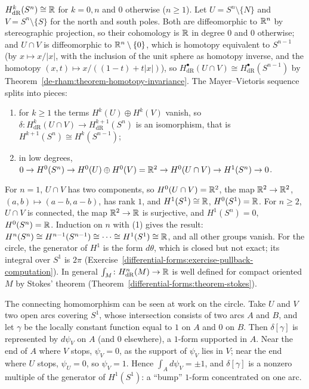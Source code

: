 \begin{example}\label{de-rham:example-spheres}
$H^k_{\mathrm{dR}}(S^n) \cong \mathbb{R}$ for $k = 0, n$ and $0$ otherwise ($n \geq 1$). Let $U = S^n \setminus \{N\}$ and $V = S^n \setminus \{S\}$ for the north and south poles. Both are
diffeomorphic to $\mathbb{R}^n$ by stereographic projection, so their cohomology is $\mathbb{R}$ in degree $0$ and $0$ otherwise; and $U \cap V$ is diffeomorphic to $\mathbb{R}^n \setminus \{0\}$, which is
homotopy equivalent to $S^{n-1}$ (by $x \mapsto x/|x|$, with the inclusion of the unit sphere as homotopy inverse, and the homotopy $(x, t) \mapsto x/((1 - t) + t|x|)$), so
$H^\bullet_{\mathrm{dR}}(U \cap V) \cong H^\bullet_{\mathrm{dR}}(S^{n-1})$ by Theorem~\ref{de-rham:theorem-homotopy-invariance}. The Mayer--Vietoris sequence splits into pieces:
\begin{enumerate}
\item for $k \geq 1$ the terms $H^k(U) \oplus H^k(V)$ vanish, so $\delta \colon H^k_{\mathrm{dR}}(U \cap V) \to H^{k+1}_{\mathrm{dR}}(S^n)$ is an isomorphism, that is
$H^{k+1}(S^n) \cong H^k(S^{n-1})$;
\item in low degrees, $0 \to H^0(S^n) \to H^0(U) \oplus H^0(V) = \mathbb{R}^2 \to H^0(U \cap V) \to H^1(S^n) \to 0$.
\end{enumerate}
For $n = 1$, $U \cap V$ has two components, so $H^0(U \cap V) = \mathbb{R}^2$, the map $\mathbb{R}^2 \to \mathbb{R}^2$, $(a, b) \mapsto (a - b, a - b)$, has rank $1$, and $H^1(S^1) \cong \mathbb{R}$, $H^0(S^1) = \mathbb{R}$. For
$n \geq 2$, $U \cap V$ is connected, the map $\mathbb{R}^2 \to \mathbb{R}$ is surjective, and $H^1(S^n) = 0$, $H^0(S^n) = \mathbb{R}$. Induction on $n$ with (1) gives the result: $H^n(S^n) \cong H^{n-1}(S^{n-1}) \cong \cdots \cong H^1(S^1) \cong \mathbb{R}$,
and all other groups vanish. For the circle, the generator of $H^1$ is the form $d\theta$, which is closed but not exact; its integral over $S^1$ is $2\pi$
(Exercise~\ref{differential-forms:exercise-pullback-computation}). In general $\int_M \colon H^n_{\mathrm{dR}}(M) \to \mathbb{R}$ is well defined for compact oriented $M$ by Stokes' theorem
(Theorem~\ref{differential-forms:theorem-stokes}).

The connecting homomorphism can be seen at work on the circle. Take $U$ and $V$ two open arcs covering $S^1$, whose intersection consists of two arcs $A$ and $B$, and let $\gamma$ be the
locally constant function equal to $1$ on $A$ and $0$ on $B$. Then $\delta[\gamma]$ is represented by $d\psi_V$ on $A$ (and $0$ elsewhere), a $1$-form supported in $A$. Near the end of $A$
where $V$ stops, $\psi_V = 0$, as the support of $\psi_V$ lies in $V$; near the end where $U$ stops, $\psi_U = 0$, so $\psi_V = 1$. Hence $\int_Ad\psi_V = \pm1$, and $\delta[\gamma]$ is a nonzero
multiple of the generator of $H^1(S^1)$: a ``bump'' $1$-form concentrated on one arc.
\end{example}

